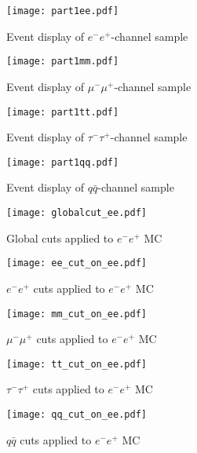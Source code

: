 \begin{figure}[h!]
    \centering
    \texttt{[image: part1ee.pdf]}
    \caption{Event display of $e^-e^+$-channel sample}
    \label{fig:part1ee}
\end{figure}

\begin{figure}[h!]
    \centering
    \texttt{[image: part1mm.pdf]}
    \caption{Event display of $\mu^-\mu^+$-channel sample}
    \label{fig:part1mm}
\end{figure}

\begin{figure}[h!]
    \centering
    \texttt{[image: part1tt.pdf]}
    \caption{Event display of $\tau^-\tau^+$-channel sample}
    \label{fig:part1tt}
\end{figure}

\begin{figure}[h!]
    \centering
    \texttt{[image: part1qq.pdf]}
    \caption{Event display of $q\bar{q}$-channel sample}
    \label{fig:part1qq}
\end{figure}

\begin{figure}[h!]
    \texttt{[image: globalcut\_ee.pdf]}
    \caption{Global cuts applied to $e^-e^+$ MC}
    \label{fig:global-ee}
\end{figure}

\begin{figure}[h!]
    \texttt{[image: ee\_cut\_on\_ee.pdf]}
    \caption{$e^-e^+$ cuts applied to $e^-e^+$ MC}
    \label{fig:eecutee}
\end{figure}

\begin{figure}[h!]
    \texttt{[image: mm\_cut\_on\_ee.pdf]}
    \caption{$\mu^-\mu^+$ cuts applied to $e^-e^+$ MC}
    \label{fig:mmcutee}
\end{figure}

\begin{figure}[h!]
    \texttt{[image: tt\_cut\_on\_ee.pdf]}
    \caption{$\tau^-\tau^+$ cuts applied to $e^-e^+$ MC}
    \label{fig:ttcutee}
\end{figure}

\begin{figure}[h!]
    \texttt{[image: qq\_cut\_on\_ee.pdf]}
    \caption{$q\bar{q}$ cuts applied to $e^-e^+$ MC}
    \label{fig:qqcutee}
\end{figure}